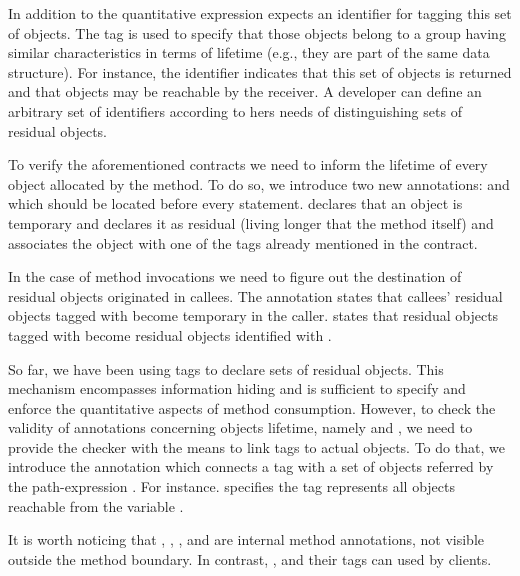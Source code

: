 In addition to the quantitative expression   expects an identifier for tagging this set of objects. The tag is used to specify that those objects belong to a group having similar characteristics in terms of lifetime (e.g., they are part of the same data structure). For instance, the identifier   indicates that this set of objects is returned and   that objects may be reachable by the receiver. A developer can define an arbitrary set of identifiers according to hers needs of distinguishing sets of residual objects.


To verify the aforementioned contracts we need to inform the lifetime of every object allocated by the method.  To do so, we introduce two new annotations:  and  which should be located before every  statement.
 declares that an object is temporary and  declares it as residual (living longer that the method itself) and associates the object with one of the tags already mentioned in the contract.

In the case of method invocations we need to figure out the destination of residual objects originated in callees. 
The annotation  states that callees' residual objects tagged with  become temporary in the caller.  states that residual objects tagged with  become residual objects identified with .

So far, we have been using tags to declare sets of residual objects. This mechanism encompasses information hiding and is sufficient to specify and enforce the quantitative aspects of method consumption. However, to check the validity of annotations concerning objects lifetime, namely  and , we need to provide the checker with the means to link tags to actual objects. To do that, we introduce the annotation  which connects a tag  with a set of objects referred by the path-expression .  For instance.  specifies the tag  represents all objects reachable from the variable . 

It is worth noticing that , , ,  and  are internal method annotations, not visible outside the method boundary. In contrast, ,  and their tags can used by clients.

